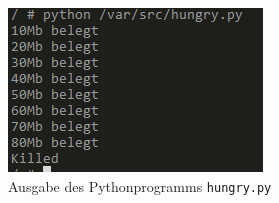 \begin{figure}[h]
	 \begin{center}
	 	\includegraphics[scale=1]{bilder/cgroup-container-killed.png}
	 	\caption{Ausgabe des Pythonprogramms \texttt{hungry.py}}
	 	\label{fig:cgroupKilled}
	 \end{center}
\end{figure}